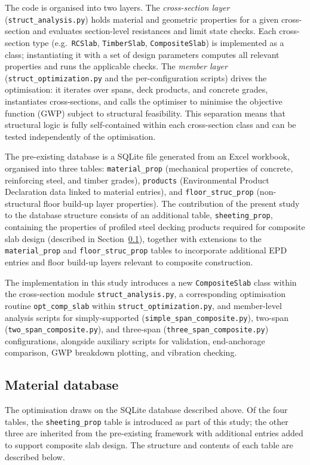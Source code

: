 The code is organised into two layers. The \textit{cross-section layer} (\texttt{struct\_analysis.py}) holds material and geometric properties for a given cross-section and evaluates section-level resistances and limit state checks. Each cross-section type (e.g.\ \texttt{RCSlab}, \texttt{TimberSlab}, \texttt{CompositeSlab}) is implemented as a class; instantiating it with a set of design parameters computes all relevant properties and runs the applicable checks. The \textit{member layer} (\texttt{struct\_optimization.py} and the per-configuration scripts) drives the optimisation: it iterates over spans, deck products, and concrete grades, instantiates cross-sections, and calls the optimiser to minimise the objective function (GWP) subject to structural feasibility. This separation means that structural logic is fully self-contained within each cross-section class and can be tested independently of the optimisation.

The pre-existing database is a SQLite file generated from an Excel workbook, organised into three tables: \texttt{material\_prop} (mechanical properties of concrete, reinforcing steel, and timber grades), \texttt{products} (Environmental Product Declaration data linked to material entries), and \texttt{floor\_struc\_prop} (non-structural floor build-up layer properties). The contribution of the present study to the database structure consists of an additional table, \texttt{sheeting\_prop}, containing the properties of profiled steel decking products required for composite slab design (described in Section~\ref{sec:database}), together with extensions to the \texttt{material\_prop} and \texttt{floor\_struc\_prop} tables to incorporate additional EPD entries and floor build-up layers relevant to composite construction.

The implementation in this study introduces a new \texttt{CompositeSlab} class within the cross-section module \texttt{struct\_analysis.py}, a corresponding optimisation routine \texttt{opt\_comp\_slab} within \texttt{struct\_optimization.py}, and member-level analysis scripts for simply-supported (\texttt{simple\allowbreak\_span\_composite.py}), two-span (\texttt{two\_span\_composite.py}), and three-span (\texttt{three\_span\_composite.py}) configurations, alongside auxiliary scripts for validation, end-anchorage comparison, GWP breakdown plotting, and vibration checking.

\subsection{Material database}
\label{sec:database}
The optimisation draws on the SQLite database described above. Of the four tables, the \texttt{sheeting\_prop} table is introduced as part of this study; the other three are inherited from the pre-existing framework with additional entries added to support composite slab design. The structure and contents of each table are described below.

